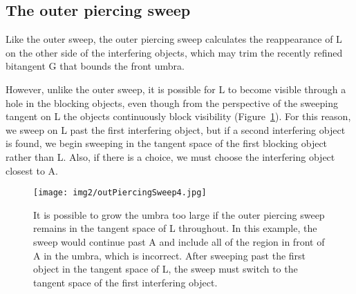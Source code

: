 \documentclass[9pt,twocolumn]{article}
\newif\ifJournal
\begin{document}
\subsection{The outer piercing sweep}


Like the outer sweep, the outer piercing sweep 
calculates the reappearance of L on the other side of the interfering objects,
which may trim the recently refined bitangent G that bounds the front umbra.
\ifJournal
We can find where L reappears around B on the other side by moving in L's tangent space away
from A.
The tangent will see past B at some outer bitangent,
typically at an outer bitangent of B and L (Figure~\ref{fig:cornell1sceneB}).
This bitangent may or may not (Figure~\ref{fig:cornell1sceneB}) 
clip the expanded front umbra.
\fi
%
%
However, unlike the outer sweep, it is
possible for L to become visible through a hole in the blocking objects,
even though from the perspective of the sweeping tangent on L the objects
continuously block visibility (Figure~\ref{fig:pivotOutPiercingSweep}).
For this reason, we sweep on L past the first interfering object, but
if a second interfering object is found,
we begin sweeping in the tangent space of the first blocking object rather than L.
Also, if there is a choice, 
we must choose the interfering object closest to A.

\begin{figure}
\begin{center}
\texttt{[image: img2/outPiercingSweep4.jpg]}
\end{center}
\caption{It is possible to grow the umbra too large if the outer piercing sweep remains
         in the tangent space of L throughout.
	 In this example, the sweep would continue past A and include all of the
	 region in front of A in the umbra, which is incorrect.
         After sweeping past the first object in the tangent space of L,
         the sweep must switch to the tangent space of the first interfering object.}
\label{fig:pivotOutPiercingSweep}
\end{figure}
\end{document}
